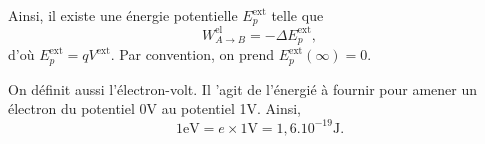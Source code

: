         Ainsi, il existe une énergie potentielle $E_{p}^{\text{ext}}$ telle que 
        \begin{equation}
            W_{A\to B}^{\text{el}}=-\Delta E_{p}^{\text{ext}},
        \end{equation}
        d'où $E_{p}^{\text{ext}}=qV^{\text{ext}}$. Par convention, on prend $E_p^{\text{ext}}(\infty)=0$.

        On définit aussi l'électron-volt. Il 'agit de l'énergié à fournir pour amener un électron du potentiel 0\si{\volt} au potentiel 1\si{\volt}. Ainsi, 
        \begin{equation}
            \boxed{
                1\si{\electronvolt}=e\times1\si{\volt}=1,6.10^{-19}\si{\joule}.
            }
        \end{equation}        